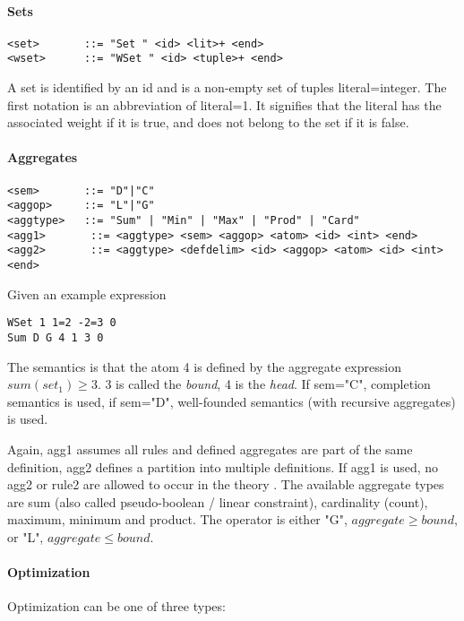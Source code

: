 \documentclass{article}
\begin{document}
\paragraph{Sets}
\begin{verbatim}
<set>       ::= "Set " <id> <lit>+ <end>
<wset>      ::= "WSet " <id> <tuple>+ <end>
\end{verbatim} 
A set is identified by an id and is a non-empty set of tuples literal=integer. The first notation is an abbreviation of literal=1. It signifies that the literal has the associated weight if it is true, and does not belong to the set if it is false.

\paragraph{Aggregates}
\begin{verbatim}
<sem>       ::= "D"|"C"
<aggop>     ::= "L"|"G"
<aggtype>   ::= "Sum" | "Min" | "Max" | "Prod" | "Card"
<agg1>       ::= <aggtype> <sem> <aggop> <atom> <id> <int> <end>
<agg2>       ::= <aggtype> <defdelim> <id> <aggop> <atom> <id> <int> <end>
\end{verbatim} 
Given an example expression
\begin{verbatim}
WSet 1 1=2 -2=3 0
Sum D G 4 1 3 0
\end{verbatim}
The semantics is that the atom 4 is defined by the aggregate expression $sum(set_1) \geq 3$. 3 is called the \emph{bound}, 4 is the \emph{head}. If sem="C", completion semantics is used, if sem="D", well-founded semantics (with recursive aggregates) is used. 

Again, agg1 assumes all rules and defined aggregates are part of the same definition, agg2 defines a partition into multiple definitions. If agg1 is used, no agg2 or rule2 are allowed to occur in the theory
.
The available aggregate types are sum (also called pseudo-boolean / linear constraint), cardinality (count), maximum, minimum and product. The operator is either "G", $aggregate \geq bound$, or "L", $aggregate \leq bound$.
 
\paragraph{Optimization}
Optimization can be one of three types:
\end{document}
